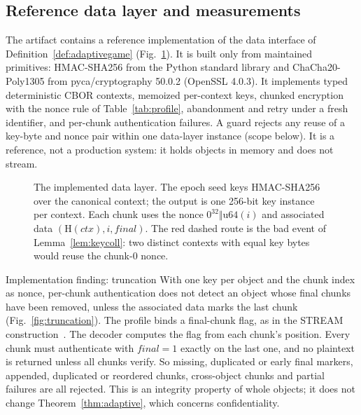 \documentclass[pdflatex,sn-mathphys-num,twocolumn]{sn-jnl}
\theoremstyle{plain}
\theoremstyle{definition}
\begin{document}
\subsection{Reference data layer and measurements}\label{sec:datalayer}
The artifact contains a reference implementation of the data interface of Definition~\ref{def:adaptivegame} (Fig.~\ref{fig:datalayer}). It is built only from maintained primitives: HMAC-SHA256 from the Python standard library and ChaCha20-Poly1305 from pyca/cryptography 50.0.2 (OpenSSL 4.0.3). It implements typed deterministic CBOR contexts, memoized per-context keys, chunked encryption with the nonce rule of Table~\ref{tab:profile}, abandonment and retry under a fresh identifier, and per-chunk authentication failures. A guard rejects any reuse of a key-byte and nonce pair within one data-layer instance (scope below). It is a reference, not a production system: it holds objects in memory and does not stream.

\begin{figure}[t]
\centering
\resizebox{\linewidth}{!}{}
\caption{The implemented data layer. The epoch seed keys HMAC-SHA256 over the canonical context; the output is one 256-bit key instance per context. Each chunk uses the nonce $0^{32}\Vert\mathrm{u64}(i)$ and associated data $(\mathrm{H}(\mathit{ctx}),i,\mathit{final})$. The red dashed route is the bad event of Lemma~\ref{lem:keycoll}: two distinct contexts with equal key bytes would reuse the chunk-0 nonce.}\label{fig:datalayer}
\end{figure}

\begin{implbox}{Implementation finding: truncation}
With one key per object and the chunk index as nonce, per-chunk authentication does not detect an object whose final chunks have been removed, unless the associated data marks the last chunk (Fig.~\ref{fig:truncation}). The profile binds a final-chunk flag, as in the STREAM construction~\cite{hoang2015}. The decoder computes the flag from each chunk's position. Every chunk must authenticate with $\mathit{final}=1$ exactly on the last one, and no plaintext is returned unless all chunks verify. So missing, duplicated or early final markers, appended, duplicated or reordered chunks, cross-object chunks and partial failures are all rejected. This is an integrity property of whole objects; it does not change Theorem~\ref{thm:adaptive}, which concerns confidentiality.
\end{implbox}
\end{document}
